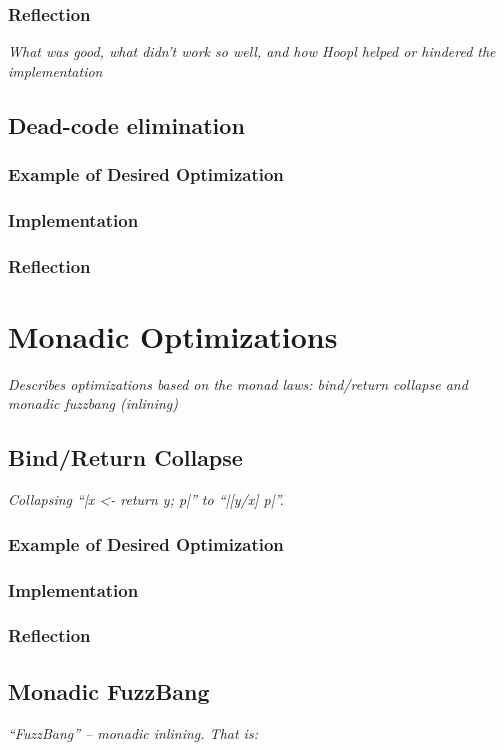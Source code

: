 \documentclass[12pt]{report}
\begin{document}
\subsection{Reflection}
\emph{What was good, what didn't work so well, and how Hoopl helped
or hindered the implementation}

\section{Dead-code elimination}
\subsection{Example of Desired Optimization}
\subsection{Implementation}
\subsection{Reflection}

\chapter{Monadic Optimizations}
\emph{Describes optimizations based on the monad laws: bind/return collapse and
  monadic fuzzbang (inlining)}

\section{Bind/Return Collapse}
\emph{Collapsing ``|x <- return y; p|'' to ``|[y/x] p|''.}
\subsection{Example of Desired Optimization}
\subsection{Implementation}
\subsection{Reflection}

\section{Monadic FuzzBang}
\emph{``FuzzBang'' --  monadic inlining. That is:}
\end{document}
